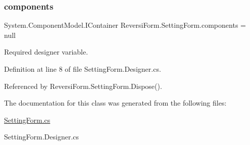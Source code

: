 \subsubsection{\texorpdfstring{components}{components}}
{\footnotesize\ttfamily System.\+Component\+Model.\+I\+Container Reversi\+Form.\+Setting\+Form.\+components = null\hspace{0.3cm}{\ttfamily [private]}}



Required designer variable. 



Definition at line 8 of file Setting\+Form.\+Designer.\+cs.



Referenced by Reversi\+Form.\+Setting\+Form.\+Dispose().



The documentation for this class was generated from the following files\+:\begin{DoxyCompactItemize}
\item 
\hyperlink{_setting_form_8cs}{Setting\+Form.\+cs}\item 
Setting\+Form.\+Designer.\+cs\end{DoxyCompactItemize}
